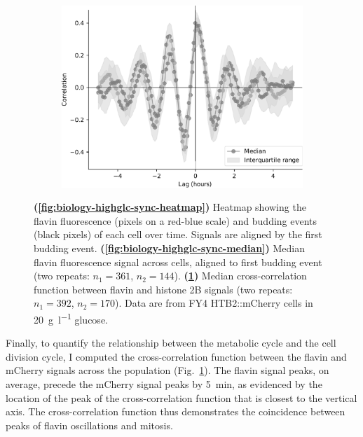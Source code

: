\begin{figure}[p]
  \begin{subfigure}[htpb]{0.7\textwidth}
   \centering
   \includegraphics[width=\textwidth]{xcf_highglcreps.pdf}
   \caption{
   }
   \label{fig:biology-highglc-sync-xcf}
  \end{subfigure}

  \caption[
    Heatmap showing the flavin fluorescence and budding events of each cell over time.
    Median flavin fluorescence signal across cells, aligned to first budding event.
    Median cross-correlation function between flavin and histone 2B signals.
    Data are from FY4 HTB2::mCherry cells in \SI{20}{\gram~\litre^{-1}} glucose.
  ]{
    \textbf{(\ref{fig:biology-highglc-sync-heatmap})}
    Heatmap showing the flavin fluorescence (pixels on a red-blue scale) and budding events (black pixels) of each cell over time.
    Signals are aligned by the first budding event.
    \textbf{(\ref{fig:biology-highglc-sync-median})}
    Median flavin fluorescence signal across cells, aligned to first budding event (two repeats: $n_{1}=361$, $n_{2}=144$).
    \textbf{(\ref{fig:biology-highglc-sync-xcf})}
    Median cross-correlation function between flavin and histone 2B signals (two repeats: $n_{1}=392$, $n_{2}=170$).
    Data are from FY4 HTB2::mCherry cells in \SI{20}{\gram~\litre^{-1}} glucose.
  }
  \label{fig:biology-highglc-sync-corr}
\end{figure}

Finally, to quantify the relationship between the metabolic cycle and the cell division cycle, I computed the cross-correlation function between the flavin and mCherry signals across the population (Fig.\ \ref{fig:biology-highglc-sync-xcf}).
The flavin signal peaks, on average, precede the mCherry signal peaks by \SI{5}{\minute}, as evidenced by the location of the peak of the cross-correlation function that is closest to the vertical axis.
The cross-correlation function thus demonstrates the coincidence between peaks of flavin oscillations and mitosis.


